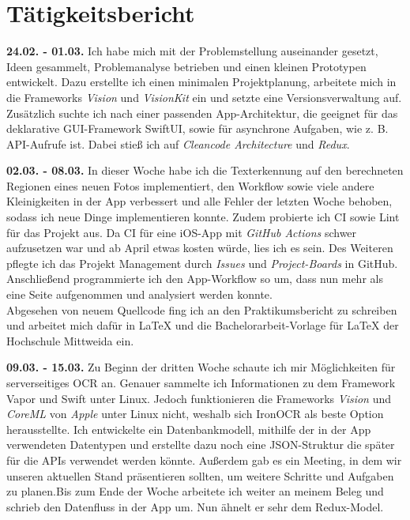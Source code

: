 \documentclass[nomenclature, oneside, 150]{HSMW-Thesis}
\begin{document}
\chapter{Tätigkeitsbericht}
	\textbf{24.02. - 01.03.}
	Ich habe mich mit der Problemstellung auseinander gesetzt, Ideen gesammelt, Problemanalyse betrieben und einen kleinen Prototypen entwickelt. Dazu erstellte ich einen minimalen Projektplanung, arbeitete mich in die Frameworks \textit{Vision} und \textit{VisionKit} ein und setzte eine Versionsverwaltung auf. Zusätzlich suchte ich nach einer passenden App-Architektur, die geeignet für das deklarative GUI-Framework SwiftUI, sowie für asynchrone Aufgaben, wie z. B. API-Aufrufe ist. Dabei stieß ich auf \textit{Cleancode Architecture} und \textit{Redux}.
	
	\textbf{02.03. - 08.03.} 
	In dieser Woche habe ich die Texterkennung auf den berechneten Regionen eines neuen Fotos implementiert, den Workflow sowie viele andere Kleinigkeiten in der App verbessert und alle Fehler der letzten Woche behoben, sodass ich neue Dinge implementieren konnte. Zudem probierte ich CI sowie Lint für das Projekt aus. Da CI für eine iOS-App mit \textit{GitHub Actions} schwer aufzusetzen war und ab April etwas kosten würde, lies ich es sein. Des Weiteren pflegte ich das Projekt Management durch \textit{Issues} und \textit{Project-Boards} in GitHub. Anschließend programmierte ich den App-Workflow so um, dass nun mehr als eine Seite aufgenommen und analysiert werden konnte. \\ 			
	Abgesehen von neuem Quellcode fing ich an den Praktikumsbericht zu schreiben und arbeitet mich dafür in \LaTeX \xspace und die Bachelorarbeit-Vorlage für \LaTeX \xspace der Hochschule Mittweida ein.
	
	\textbf{09.03. - 15.03.} 
	Zu Beginn der dritten Woche schaute ich mir Möglichkeiten für serverseitiges OCR an. Genauer sammelte ich Informationen zu dem Framework Vapor und Swift unter Linux. Jedoch funktionieren die Frameworks \textit{Vision} und \textit{CoreML} von \textit{Apple} unter Linux nicht, weshalb sich IronOCR als beste Option herausstellte. Ich entwickelte ein Datenbankmodell, mithilfe der in der App verwendeten Datentypen und erstellte dazu noch eine JSON-Struktur die später für die APIs verwendet werden könnte. Außerdem gab es ein Meeting, in dem wir unseren aktuellen Stand präsentieren sollten, um weitere Schritte und Aufgaben zu planen.Bis zum Ende der Woche arbeitete ich weiter an meinem Beleg und schrieb den Datenfluss in der App um. Nun ähnelt er sehr dem Redux-Model.
	
\end{document}
